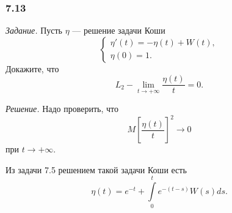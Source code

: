 \subsubsection*{7.13}

\textit{Задание.}
Пусть $ \eta $ --- решение задачи Коши
$$ \begin{cases}
    \eta' \left( t \right) = -\eta \left( t \right) + W \left( t \right), \\
    \eta \left( 0 \right) = 1.
  \end{cases}$$
Докажите, что
$$L_2-\lim \limits_{t \to +\infty } \frac{ \eta \left( t \right) }{t} =
  0.$$

\textit{Решение.}
Надо проверить, что
$$M \left[ \frac{ \eta \left( t \right) }{t} \right]^2 \to
  0$$
при $t \to +\infty $.

Из задачи 7.5 решением такой задачи Коши есть
$$ \eta \left( t \right) =
  e^{-t} + \int \limits_0^t e^{-\left( t - s \right) } W \left( s \right) ds.$$

